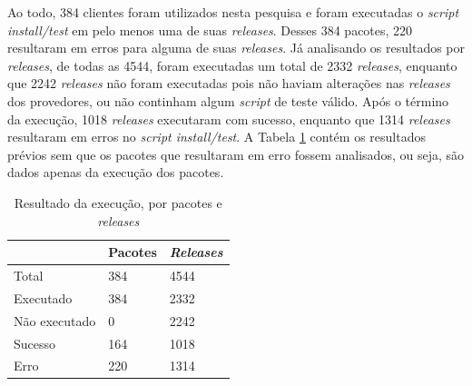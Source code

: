 

Ao todo, 384 clientes foram utilizados nesta pesquisa e foram executadas o \textit{script install/test} em pelo menos uma de suas \textit{releases}. Desses 384 pacotes, 220 resultaram em erros para alguma de suas \textit{releases}. Já analisando os resultados por \textit{releases}, de todas as 4544, foram executadas um total de 2332 \textit{releases}, enquanto que 2242 \textit{releases} não foram executadas pois não haviam alterações nas \textit{releases} dos provedores, ou não continham algum \textit{script} de teste válido. Após o término da execução, 1018 \textit{releases} executaram com sucesso, enquanto que 1314 \textit{releases} resultaram em erros no \textit{script install/test}. A Tabela \ref{tab:res_rq1_1} contém os resultados prévios sem que os pacotes que resultaram em erro fossem analisados, ou seja, são dados apenas da execução dos pacotes.

\begin{table}[]
\centering
\begin{tabular}{|l|l|l|}
\hline
                    & Pacotes & \textit{Releases} \\ \hline
    Total           & 384     & 4544     \\
    Executado       & 384     & 2332     \\
    Não executado   & 0       & 2242     \\
    Sucesso         & 164     & 1018     \\
    Erro            & 220     & 1314     \\ \hline
\end{tabular}
\caption{Resultado da execução, por pacotes e \textit{releases}}
\label{tab:res_rq1_1}
\end{table}

